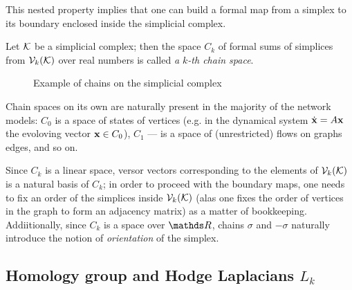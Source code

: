 This nested property implies that one can build a formal map from a simplex to its boundary enclosed inside the simplicial complex. 

\begin{definition}
      Let \( \mathcal{K} \) be a simplicial complex; then the space \( C_k \) of formal sums of simplices from \( \mathcal{V}_{k}(\mathcal{K}) \) over real numbers is called \emph{a \( k\)-th chain space}.

\end{definition}

\begin{example}    
      \begin{figure}[hbtp]
            \centering
            
            \caption{Example of chains on the simplicial complex \label{fig:weak_example}}
      \end{figure}

\end{example}

Chain spaces on its own are naturally present in the majority of the network models: \( C_0 \) is a space of states of vertices (e.g. in the dynamical system \( \dot{ \mathbf{x} } = A \mathbf{x} \) the evoloving vector \( \mathbf{x} \in C_0 \)), \( C_1 \) --- is a space of (unrestricted) flows on graphs edges, and so on.

Since \( C_k \) is a linear space, versor vectors corresponding to the elements of \( \mathcal{V}_{k}(\mathcal{K})\) is a natural basis of \( C_k \); in order to proceed with the boundary maps, one needs to fix an order of the simplices inside \( \mathcal{V}_{k}(\mathcal{K}) \) (alas one fixes the order of vertices in the graph to form an adjacency matrix) as a matter of bookkeeping. Addiitionally, since \( C_k \) is a space over \( \ds R \), chains \( \sigma \) and \( - \sigma \) naturally introduce the notion of \emph{orientation} of the simplex.







\subsection{ Homology group and Hodge Laplacians \( L_k \) }

